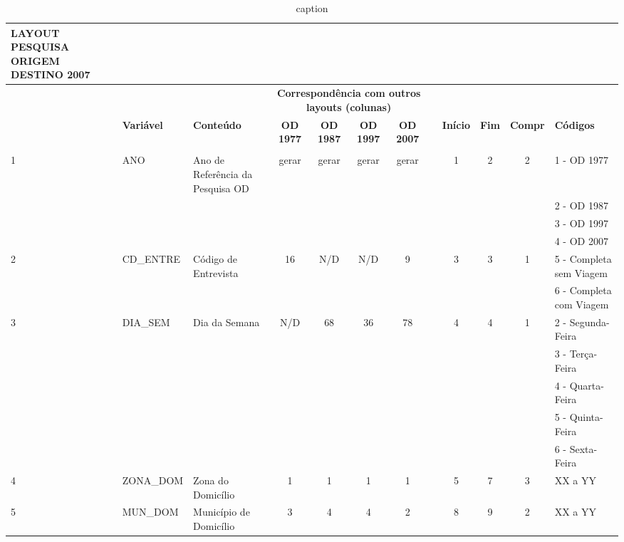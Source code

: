 \begin{table}[htbp]
\caption{caption}
\begin{center}
\begin{tabular}{|p{1cm}|l|l|c|c|c|c|c|c|c|c|l|}
\hline
\multicolumn{1}{|l|}{\textbf{LAYOUT PESQUISA ORIGEM DESTINO 2007}} & \textbf{} & \textbf{} & \textbf{} & \textbf{} & \textbf{} & \textbf{} & \textbf{} & \textbf{} & \textbf{} & \textbf{} & \multicolumn{1}{r|}{\textbf{}} \\ \hline
\multicolumn{1}{|l|}{\textbf{}} & \textbf{} & \textbf{} & \multicolumn{ 4}{c|}{\textbf{Correspondência com outros layouts (colunas)}} & \textbf{} & \textbf{} & \textbf{} & \textbf{} & \multicolumn{1}{r|}{\textbf{}} \\ \hline
\textbf{} & \textbf{Variável} & \textbf{Conteúdo} & \textbf{OD 1977} & \textbf{OD 1987} & \textbf{OD 1997} & \textbf{OD 2007} & \textbf{} & \textbf{Início} & \textbf{Fim} & \textbf{Compr} & \textbf{Códigos} \\ \hline
\textbf{} & \textbf{} & \textbf{} & \textbf{} & \textbf{} & \textbf{} & \textbf{} & \textbf{} & \textbf{} & \textbf{} & \textbf{} & \textbf{} \\ \hline
1 & ANO & Ano de Referência da Pesquisa OD & gerar & gerar & gerar & gerar &  & 1 & 2 & 2 & 1 - OD 1977 \\ \hline
 &  &  &  &  &  &  &  &  &  &  & 2 - OD 1987 \\ \hline
 &  &  &  &  &  &  &  &  &  &  & 3 - OD 1997 \\ \hline
 &  &  &  &  &  &  &  &  &  &  & 4 - OD 2007 \\ \hline
2 & CD\_ENTRE & Código de Entrevista & 16 & N/D & N/D & 9 &  & 3 & 3 & 1 & 5 - Completa sem Viagem  \\ \hline
 &  &  &  &  &  &  &  &  &  &  & 6 - Completa com Viagem \\ \hline
3 & DIA\_SEM & Dia da Semana & N/D & 68 & 36 & 78 &  & 4 & 4 & 1 & 2 - Segunda-Feira \\ \hline
 &  &  &  &  &  &  &  &  &  &  & 3 - Terça-Feira \\ \hline
 &  &  &  &  &  &  &  &  &  &  & 4 - Quarta-Feira \\ \hline
 &  &  &  &  &  &  &  &  &  &  & 5 - Quinta-Feira \\ \hline
 &  &  &  &  &  &  &  &  &  &  & 6 - Sexta-Feira \\ \hline
4 & ZONA\_DOM & Zona do Domicílio & 1 & 1 & 1 & 1 &  & 5 & 7 & 3 & XX a YY \\ \hline
5 & MUN\_DOM & Município  de Domicílio & 3 & 4 & 4 & 2 &  & 8 & 9 & 2 & XX a YY \\ \hline

\end{tabular}
\end{center}
\end{table}
